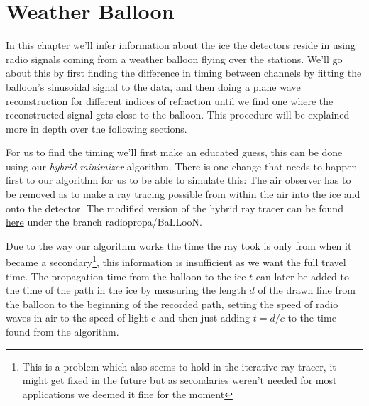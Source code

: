 \chapter{Weather Balloon}
\label{chap:WB}
In this chapter we'll infer information about the ice the detectors reside in
using radio signals coming from a weather balloon flying over the stations. 
We'll go about this by first finding the difference in timing between  
channels by fitting the balloon's sinusoidal signal to the data, and
then doing a plane wave reconstruction for different indices of refraction
until we find one where the reconstructed signal gets close to the balloon.
This procedure will be explained more in depth over the following sections.

For us to find the timing we'll first make an educated guess, this can be done
using our \textit{hybrid minimizer} algorithm. There is one change that needs to
happen first to our algorithm for us to be able to simulate this: The air
observer has to be removed as to make a ray tracing possible from
within the air into the ice and onto the detector. The modified
version of the hybrid ray tracer can be found \href{https://github.com/arthuradriaens-code/NuRadioMC.git}{here} under the branch radiopropa/BaLLooN.

Due to the way our algorithm works the time the ray took is only from when it
became a secondary\footnote{This is a problem which also seems to hold in the 
iterative ray tracer, it might get fixed in the future but as
secondaries weren't needed for most applications we deemed it fine for the
moment}, this information is insufficient as we want the full travel time.  The
propagation time from the balloon to the ice $t$ can later be added to the time
of the path in the ice by measuring the length $d$ of the drawn line from the
balloon to the beginning of the recorded path, setting the speed of radio waves
in air to the speed of light c and then just adding $t = d/c$ to the time found
from the algorithm.
